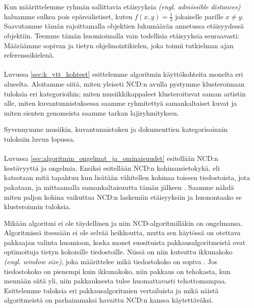 \documentclass[12pt,finnish,draft,twoside]{tktltiki2}
\theoremstyle{definition}
\theoremstyle{remark}
\newcommand{\engl}[1]{\emph{(engl. #1)}}
\begin{document}
  Kun määrittelemme ryhmän sallittavia etäisyyksia \engl{admissible distances} haluamme sulkea pois epärealistiset, kuten $f(x,y) = \frac{1}{2}$ jokaiselle parille $x \neq y$. Saavutamme tämän rajoittamalla objektien lukumäärän annetussa etäisyydessä objektiin. Teemme tämän huomioimalla vain todellisia etäisyyksia seuraavasti: Määräämme sopivan ja tietyn ohjelmointikielen, joka toimii tutkielman ajan referenssikielenä. \cite{CV05}


\paragraph{} %
\label{par:intro-3}
  Luvussa \ref{sec:k_ytt_kohteet} esittelemme algoritmin käyttökohteita monelta eri alueelta. Aloitamme siitä, miten yleiseti NCD:n avulla pystymme klusteroimaan tuloksia eri kategorioihin; miten musiikkikappaleet klusteroituvat saman artistin alle, miten kuvantunnistuksessa saamme ryhmitettyä samankaltaiset kuvat ja miten sienten genomeista saamme tarkan lajiryhmityksen.

  Syvennymme musiikin, kuvantunnistuken ja dokumenttien kategorisoinnin tuloksiin luvun lopussa.


\paragraph{} %
\label{par:intro-4}
  Luvussa \ref{sec:algoritmin_ongelmat_ja_ominaisuudet} esitellään NCD:n kestävyyttä ja ongelmia. Ensiksi esitellään NCD:n kohinansietokykä, eli katsotaan mitä tapahtuu kun lisätään vähitellen kohinaa toiseen tiedostoista, jota pakataan, ja mittaamalla samankaltaisuutta tämän jälkeen \cite{4167725}. Saamme nähdä miten paljon kohina vaikuttaa NCD:n laskemiin etäisyyksiin ja huonontaako se klusteroinnin tuloksia.

  Mikään algoritmi ei ole täydellinen ja niin NCD-algoritmilläkin on ongelmansa. Algoritmissä itsessään ei ole selvää heikkoutta, mutta sen käytössä on otettava pakkaajan valinta huomioon, koska monet suosituista pakkausalgoritmeistä ovat optimoituja tietyn kokoisille tiedostoille. Niissä on niin kutsuttu ikkunakoko \engl{window size}, joka määrittelee mikä tiedostokoko on sopiva \cite{cebrian2005common}. Jos tiedostokoko on pienempi kuin ikkunakoko, niin pakkaus on tehokasta, kun mennään siitä yli, niin pakkauksesta tulee huomattavasti tehottomampaa. Esittelemme tuloksia eri pakkausalgoritmien vertailuista ja mikä näistä algoritmeistä on parhaimmaksi havaittu NCD:n kanssa käytettäväksi.
\end{document}
